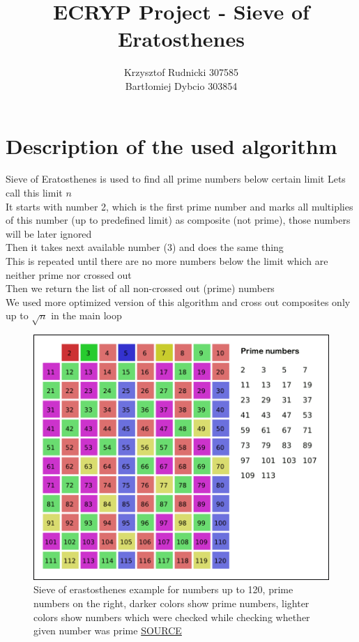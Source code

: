 \documentclass[12pt]{article}
\title{ECRYP Project - Sieve of Eratosthenes}
\author{Krzysztof Rudnicki 307585 \\ Bartłomiej Dybcio 303854}
\begin{document}
\maketitle
\section{Description of the used algorithm}
Sieve of Eratosthenes is used to find all prime numbers below certain limit Lets call this limit $n$ \\ 
It starts with number 2, which is the first prime number and marks all multiplies of this number (up to predefined limit) as composite (not prime), those numbers will be later ignored \\ 
Then it takes next available number (3) and does the same thing \\ 
This is repeated until there are no more numbers below the limit which are neither prime nor crossed out \\ 
Then we return the list of all non-crossed out (prime) numbers \\ 
We used more optimized version of this algorithm and cross out composites only up to $\sqrt{n}$ in the main loop \\ 
\begin{figure}[H]

\centering
\includegraphics{screenshoot/algorithm_description.png}
\caption{Sieve of erastosthenes example for numbers up to 120, prime numbers on the right, darker colors show prime numbers, lighter colors show numbers which were checked while checking whether given number was prime \href{https://en.wikipedia.org/wiki/Sieve_of_Eratosthenes}{SOURCE} }
\end{figure}
\end{document}
